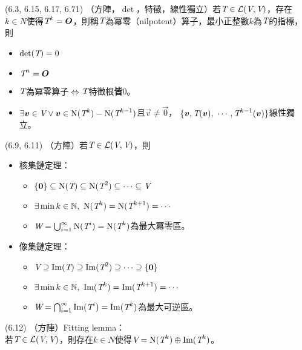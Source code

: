 \item \begin{theorem}{(6.3, 6.15, 6.17, 6.71)} （方陣，$\det$，特徵，線性獨立）若$\textit{T} \in \mathcal{L}(\textit{V}, \textit{V})$，存在$k \in N$使得$\textit{T}^{k} = \boldsymbol{O}$，則稱$\textit{T}$為冪零（nilpotent）算子，最小正整數$k$為$\textit{T}$的指標，則
	\begin{itemize}
		\item $\det(\textit{T}) = 0$
		\item $\textit{T}^n = \boldsymbol{O}$
		\item $\textit{T}$為冪零算子$\iff$$\textit{T}$特徵根\textbf{皆}$0$。
		\item $\exists \boldsymbol{v} \in \textit{V} \lor \boldsymbol{v} \in \operatorname{N}(\textit{T}^k) - \operatorname{N}(\textit{T}^{k - 1})$且$\vec{v} \neq \vec{0}$，
		$\{\boldsymbol{v}, \textit{T}(\boldsymbol{v}), \ \cdots, \textit{T}^{k - 1}(\boldsymbol{v})\}$線性獨立。
	\end{itemize}
\end{theorem}

\item \begin{theorem}{(6.9, 6.11)} （方陣）若$\textit{T} \in \mathcal{L}(\textit{V}, \textit{V})$，則
	\begin{itemize}
		\item 核集鏈定理：
			\begin{itemize}
				\item $\{\boldsymbol{0}\} \subseteq \operatorname{N}(\textit{T}) \subseteq \operatorname{N}(\textit{T}^2) \subseteq \cdots \subseteq \textit{V}$
				\item $\exists \min k \in \mathbb{N}, \ \operatorname{N}(\textit{T}^{k}) = \operatorname{N}(\textit{T}^{k + 1}) = \cdots$
				\item $\textit{W} = \bigcup_{i = 1}^{\infty} \operatorname{N}(\textit{T}^i) = \operatorname{N}(\textit{T}^k)$為最大冪零區。
			\end{itemize}
		\item 像集鏈定理：
			\begin{itemize}
				\item $\textit{V} \supseteq \operatorname{Im}(\textit{T}) \supseteq \operatorname{Im}(\textit{T}^2) \supseteq \cdots \supseteq \{\boldsymbol{0}\}$
				\item $\exists \min k \in \mathbb{N}, \ \operatorname{Im}(\textit{T}^{k}) = \operatorname{Im}(\textit{T}^{k + 1}) = \cdots$
				\item $\textit{W} = \bigcap_{i = 1}^{\infty} \operatorname{Im}(\textit{T}^i) = \operatorname{Im}(\textit{T}^k)$為最大可逆區。
			\end{itemize}
	\end{itemize}
\end{theorem}

\item \begin{theorem}{(6.12)} （方陣）Fitting lemma： \\
	若$\textit{T} \in \mathcal{L}(\textit{V}, \textit{V})$，則存在$k \in N$使得$\textit{V} = \operatorname{N}(\textit{T}^k) \oplus \operatorname{Im}(\textit{T}^k)$。
\end{theorem}


